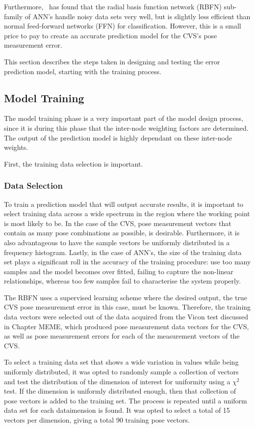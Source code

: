 Furthermore,~\cite{xie2011comparison} has found that the radial basis function network (RBFN) sub-family of ANN's handle noisy data sets very well, but is slightly less efficient than normal feed-forward networks (FFN) for classification. However, this is a small price to pay to create an accurate prediction model for the CVS's pose measurement error. 

This section describes the steps taken in designing and testing the error prediction model, starting with the training process.

\subsection{Model Training}

The model training phase is a very important part of the model design process, since it is during this phase that the inter-node weighting factors are determined. The output of the prediction model is highly dependant on these inter-node weights.  

First, the training data selection is important. 
\subsubsection{Data Selection}

To train a prediction model that will output accurate results, it is important to select training data across a wide spectrum in the region where the working point is most likely to be. In the case of the CVS, pose measurement vectors that contain as many pose combinations as possible, is desirable. Furthermore, it is also advantageous to have the sample vectors be uniformly distributed in a frequency histogram. Lastly, in the case of ANN's, the size of the training data set plays a significant roll in the accuracy of the training procedure: use too many samples and the model becomes over fitted, failing to capture the non-linear relationships, whereas too few samples fail to characterise the system properly. 

The RBFN uses a supervised learning scheme where the desired output, the true CVS pose measurement error in this case, must be known. Therefore, the training data vectors were selected out of the data acquired from the Vicon test discussed in Chapter MEME, which produced pose measurement data vectors for the CVS, as well as pose measurement errors for each of the measurement vectors of the CVS. 

To select a training data set that shows a wide variation in values while being uniformly distributed, it was opted to randomly sample a collection of vectors and test the distribution of the dimension of interest for uniformity using a $\chi^2$ test. If the dimension is uniformly distributed enough, then that collection of pose vectors is added to the training set. The process is repeated until a uniform data set for each dataimension is found. It was opted to select a total of 15 vectors per dimension, giving a total 90 training pose vectors. 

